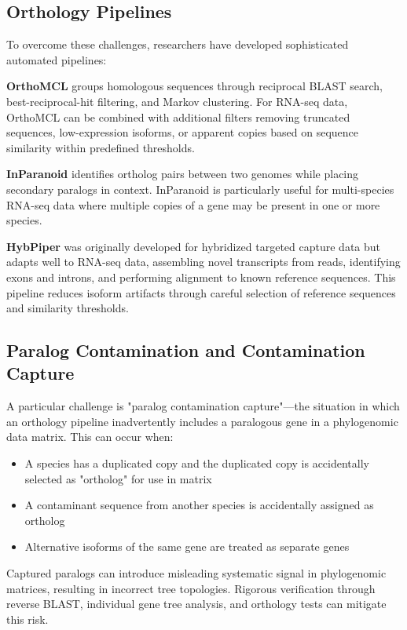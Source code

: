 \subsection{Orthology Pipelines}

To overcome these challenges, researchers have developed sophisticated automated pipelines:

\textbf{OrthoMCL} groups homologous sequences through reciprocal BLAST search, best-reciprocal-hit filtering, and Markov clustering. For RNA-seq data, OrthoMCL can be combined with additional filters removing truncated sequences, low-expression isoforms, or apparent copies based on sequence similarity within predefined thresholds.

\textbf{InParanoid} identifies ortholog pairs between two genomes while placing secondary paralogs in context. InParanoid is particularly useful for multi-species RNA-seq data where multiple copies of a gene may be present in one or more species.

\textbf{HybPiper} was originally developed for hybridized targeted capture data but adapts well to RNA-seq data, assembling novel transcripts from reads, identifying exons and introns, and performing alignment to known reference sequences. This pipeline reduces isoform artifacts through careful selection of reference sequences and similarity thresholds.

\subsection{Paralog Contamination and Contamination Capture}

A particular challenge is "paralog contamination capture"---the situation in which an orthology pipeline inadvertently includes a paralogous gene in a phylogenomic data matrix. This can occur when:

\begin{itemize}
\item A species has a duplicated copy and the duplicated copy is accidentally selected as "ortholog" for use in matrix
\item A contaminant sequence from another species is accidentally assigned as ortholog
\item Alternative isoforms of the same gene are treated as separate genes
\end{itemize}

Captured paralogs can introduce misleading systematic signal in phylogenomic matrices, resulting in incorrect tree topologies. Rigorous verification through reverse BLAST, individual gene tree analysis, and orthology tests can mitigate this risk.

